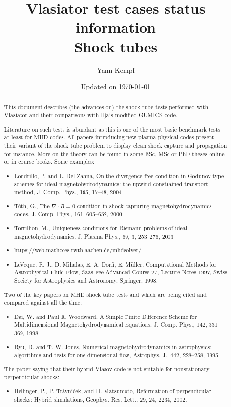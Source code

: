 \documentclass[a4paper,10pt]{scrartcl}
\title{
\Huge{Vlasiator test cases status information} \\
\LARGE{Shock tubes}
}
\author{Yann Kempf}
\date{Updated on \today}
\begin{document}
\maketitle

\begin{abstract}
This document describes (the advances on) the shock tube tests performed with Vlasiator and their comparisons with Ilja's modified GUMICS code.

Literature on such tests is abundant as this is one of the most basic benchmark tests at least for MHD codes. All papers introducing new plasma physical codes present their variant of the shock tube problem to display clean shock capture and propagation for instance. More on the theory can be found in some BSc, MSc or PhD theses online or in course books. Some examples:
\begin{itemize}
 \item Londrillo, P. and L. Del Zanna, On the divergence-free condition in Godunov-type schemes for ideal magnetohydrodynamics: the upwind constrained transport method, J. Comp. Phys., 195, 17--48, 2004
 \item Tóth, G., The $\nabla \cdot B = 0$ condition in shock-capturing magnetohydrodynamics codes, J. Comp. Phys., 161, 605--652, 2000
 \item Torrilhon, M., Uniqueness conditions for Riemann problems of ideal magnetohydrodynamics, J. Plasma Phys., 69, 3, 253--276, 2003
 \item \url{https://web.mathcces.rwth-aachen.de/mhdsolver/}
 \item LeVeque, R. J., D. Mihalas, E. A. Dorfi, E. Müller, Computational Methods for Astrophysical Fluid Flow, Saas-Fee Advanced Course 27, Lecture Notes 1997, Swiss Society for Astrophysics and Astronomy, Springer, 1998.
\end{itemize}

Two of the key papers on MHD shock tube tests and which are being cited and compared against all the time:
\begin{itemize}
 \item Dai, W. and Paul R. Woodward, A Simple Finite Difference Scheme for Multidimensional Magnetohydrodynamical Equations, J. Comp. Phys., 142, 331--369, 1998
 \item Ryu, D. and T. W. Jones, Numerical magnetohydrodynamics in astrophysics: algorithms and tests for one-dimensional flow, Astrophys. J., 442, 228--258, 1995.
\end{itemize}

The paper saying that their hybrid-Vlasov code is not suitable for nonstationary perpendicular shocks:
\begin{itemize}
 \item Hellinger, P., P. Trávníček, and H. Matsumoto, Reformation of perpendicular shocks: Hybrid simulations, Geophys. Res. Lett., 29, 24, 2234, 2002.
\end{itemize}


\end{abstract}
\end{document}
